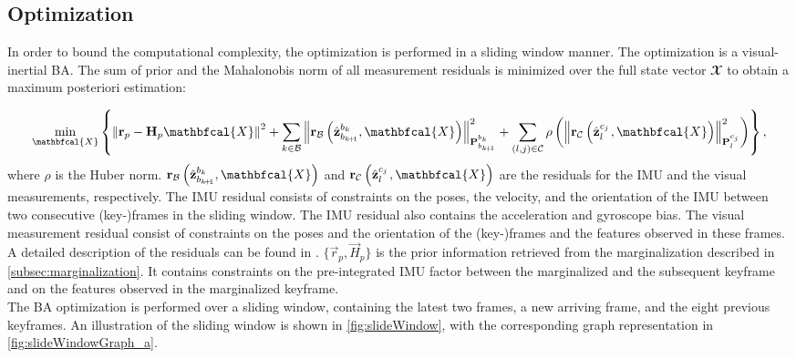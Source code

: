 \subsection{Optimization}
\label{subsec:optimization}
In order to bound the computational complexity, the optimization is performed 
in a sliding window manner. The optimization is a visual-inertial \ac{BA}. The 
sum of prior and the Mahalonobis norm of all measurement residuals is minimized 
over the full state vector $\mathbfcal{X}$ to obtain a maximum posteriori 
estimation: 

\begin{equation}\label{eq:optimization}
\displaystyle
\min_{\mathbfcal{X}} \left\{ \left\lVert \vec{r}_p - \vec{H}_p\mathbfcal{X} 
\right\rVert^{2} +
\sum_{k\in \mathcal{B}} \left\lVert 
\vec{r}_\mathcal{B}\left(\vhat{z}^{b{_k}}_{b_{k\!+\!1}}, \mathbfcal{X} 
\right)\right\rVert^{2}_{\vec{P}^{b_k}_{b_{k\!+\!1}}} + 
\sum_{\left(l,j\right) \in \mathcal{C}} \rho \left( \left\lVert 
\vec{r}_\mathcal{C}\left(\vhat{z}^{c_{j}}_{l_{\textcolor{white}{+}}}, 
\mathbfcal{X} \right)\right\rVert^{2}_{\vec{P}^{c_j}_{l}} \right)
\right\},
\end{equation}
where $\rho$ is the Huber norm. 
$\vec{r}_\mathcal{B}\left(\vhat{z}^{b{_k}}_{b_{k\!+\!1}}, \mathbfcal{X} 
\right)$
and 
$\vec{r}_\mathcal{C}\left(\vhat{z}^{c_{j}}_{l_{\textcolor{white}{+}}}, 
\mathbfcal{X} \right)$
are the residuals for the \ac{IMU} and the visual measurements, respectively. 
The \ac{IMU} residual consists of constraints on the poses, the velocity, and 
the orientation of the \ac{IMU} between two consecutive (key-)frames in the 
sliding window. The \ac{IMU} residual also contains the acceleration and 
gyroscope bias. The visual measurement residual consist of constraints on the 
poses and the orientation of the (key-)frames and the features observed in these 
frames. A detailed description of the residuals can be found in 
\citep{Qin2017VINS}. $\{ \vec{r}_p, \vec{H}_p\}$ is the prior information 
retrieved from the marginalization described in 
\autoref{subsec:marginalization}. It contains constraints on the pre-integrated 
\ac{IMU} factor between the marginalized and the subsequent keyframe and on the 
features observed in the marginalized keyframe. \\

The \ac{BA} optimization is performed over a sliding window, containing the 
latest two frames, a new arriving frame, and the eight previous 
keyframes. An illustration of the sliding window is shown in 
\autoref{fig:slideWindow}, with the corresponding graph representation in 
\autoref{fig:slideWindowGraph_a}.

